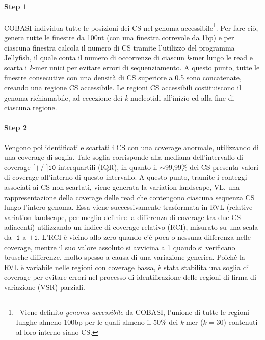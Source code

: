 \documentclass[../main.tex]{subfiles}
\begin{document}
\paragraph{Step 1} COBASI individua tutte le posizioni dei CS nel genoma accessibile\footnote{\ Viene definito \textit{genoma accessibile} da COBASI, l'unione di tutte le regioni lunghe almeno 100bp per le quali almeno il 50\% dei \textit{k}-mer ($k = 30$) contenuti al loro interno siano CS.}. Per fare ciò, genera tutte le finestre da 100nt (con una finestra correvole da 1bp) e per ciascuna finestra calcola il numero di CS tramite l'utilizzo del programma Jellyfish, il quale conta il numero di occorrenze di ciascun \textit{k}-mer lungo le read e scarta i \textit{k}-mer unici per evitare errori di sequenziamento. A questo punto, tutte le finestre consecutive con una densità di CS superiore a 0.5 sono concatenate, creando una regione CS accessibile. Le regioni CS accessibili costituiscono il genoma richiamabile, ad eccezione dei \textit{k} nucleotidi all'inizio ed alla fine di ciascuna regione.

\paragraph{Step 2} Vengono poi identificati e scartati i CS con una coverage anormale, utilizzando di una coverage di soglia. Tale soglia corrisponde alla mediana dell'intervallo di coverage $\texttt{[+/-]10}$ interquartili (IQR), in quanto il $\sim$99,99\% dei CS presenta valori di coverage all'interno di questo intervallo. A questo punto, tramite i conteggi associati ai CS non scartati, viene generata la variation landscape, VL, una rappresentazione della coverage delle read che contengono ciascuna sequenza CS lungo l'intero genoma.  Essa viene successivamente trasformata in RVL (relative variation landscape, per meglio definire la differenza di coverage tra due CS adiacenti) utilizzando un indice di coverage relativo (RCI), misurato su una scala da $\texttt{-1}$ a $\texttt{+1}$. L'RCI è vicino allo zero quando c'è poca o nessuna differenza nelle coverage, mentre il suo valore assoluto si avvicina a 1 quando si verificano brusche differenze, molto spesso a causa di una variazione generica. Poiché la RVL è variabile nelle regioni con coverage bassa, è stata stabilita una soglia di coverage per evitare errori nel processo di identificazione delle regioni di firma di variazione (VSR) parziali.
\end{document}
